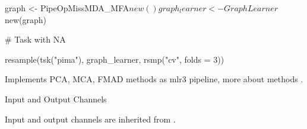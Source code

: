 \documentclass[letterpaper]{book}
\begin{document}
%
\begin{Examples}
\begin{ExampleCode}
{
  graph <- PipeOpMissMDA_MFA$new() %
  graph_learner <- GraphLearner$new(graph)

  # Task with NA

  resample(tsk("pima"), graph_learner, rsmp("cv", folds = 3))
}
\end{ExampleCode}
\end{Examples}
%
\begin{Description}\relax
Implements PCA, MCA, FMAD methods as mlr3 pipeline, more about methods .
\end{Description}
%
\begin{Section}{Input and Output Channels}

Input and output channels are inherited from .
\end{Section}
%
\end{document}
